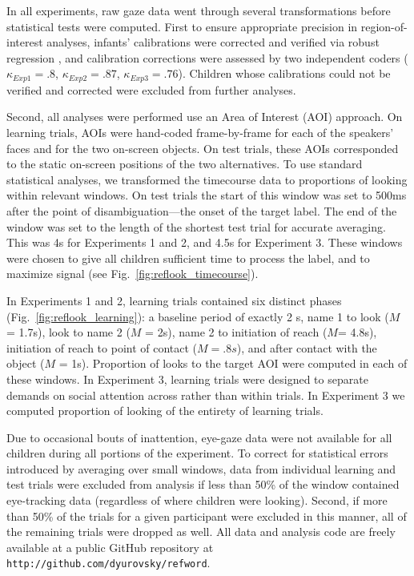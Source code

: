 \documentclass{pnastwo}
\begin{document}
\begin{article}
\begin{materials}
In all experiments, raw gaze data went through several transformations before statistical tests were computed. First to ensure appropriate precision in region-of-interest analyses, infants' calibrations were corrected and verified via robust regression \citep[described in][]{frank2012}, and calibration corrections were assessed by two independent coders ({\small$\kappa_{Exp1} = .8$}, {\small$\kappa_{Exp2} = .87$}, {\small$\kappa_{Exp3} = .76$}). Children whose calibrations could not be verified and corrected were excluded from further analyses.

Second, all analyses were performed use an Area of Interest (AOI) approach. On learning trials, AOIs were hand-coded frame-by-frame for each of the speakers' faces and for the two on-screen objects. On test trials, these AOIs corresponded to the static on-screen positions of the two alternatives. To use standard statistical analyses, we transformed the timecourse data to proportions of looking within relevant windows. On test trials the start of this window was set to 500ms after the point of disambiguation---the onset of the target label. The end of the window was set to the length of the shortest test trial for accurate averaging. This was 4s for Experiments 1 and 2, and 4.5s for Experiment 3. These windows were chosen to give all children sufficient time to process the label, and to maximize signal (see Fig.~\ref{fig:reflook_timecourse}).

In Experiments 1 and 2, learning trials contained six distinct phases (Fig.~\ref{fig:reflook_learning}): a baseline period of exactly 2 s, name 1 to look ({\small$M$ = 1.7s}), look to name 2 ({\small$M$ = 2s}), name 2 to initiation of reach ({\small$M$= 4.8s}), initiation of reach to point of contact ({\small$M = .8s$}), and after contact with the object ({\small$M$ = 1s}). Proportion of looks to the target AOI were computed in each of these windows. In Experiment 3, learning trials were designed to separate demands on social attention across rather than within trials. In Experiment 3 we computed proportion of looking of the entirety of learning trials.

Due to occasional bouts of inattention, eye-gaze data were not available for all children during all portions of the experiment. To correct for statistical errors introduced by averaging over small windows, data from individual learning and test trials were excluded from analysis if less than 50\% of the window contained eye-tracking data (regardless of where children were looking). Second, if more than 50\% of the trials for a given participant were excluded in this manner, all of the remaining trials were dropped as well. All data and analysis code are freely available at a public GitHub repository at \small{\tt{http://github.com/dyurovsky/refword}}.


\end{materials}
\end{article}
\end{document}

